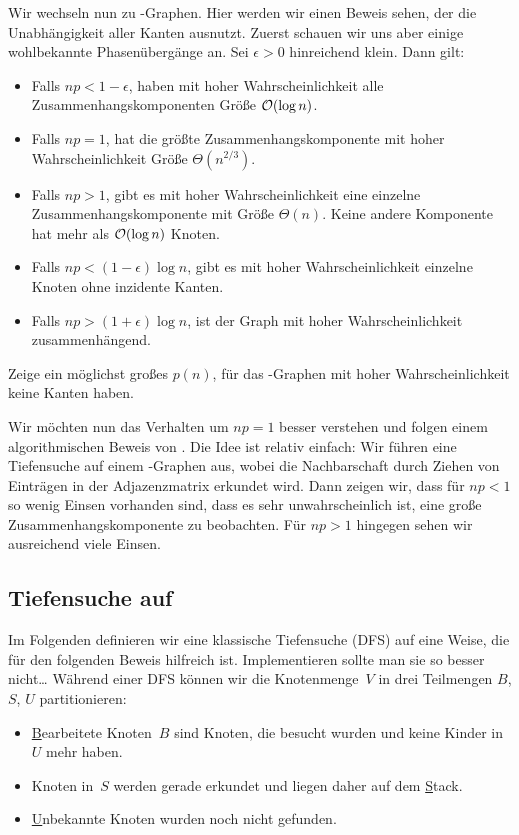 Wir wechseln nun zu \Gnp-Graphen.
Hier werden wir einen Beweis sehen, der die Unabhängigkeit aller Kanten ausnutzt.
Zuerst schauen wir uns aber einige wohlbekannte Phasenübergänge an.
Sei $\epsilon >0$ hinreichend klein.
Dann gilt:
\begin{itemize}
    \item Falls $np < 1 - \epsilon$, haben mit hoher Wahrscheinlichkeit alle Zusammenhangskomponenten Größe $\mathcal{O}\!\left(\log n\right)$.
    \item Falls $np = 1$, hat die größte Zusammenhangskomponente mit hoher Wahrscheinlichkeit Größe $\Theta(n^{2/3})$.
    \item Falls $np > 1$, gibt es mit hoher Wahrscheinlichkeit eine einzelne Zusammenhangskomponente mit Größe $\Theta(n)$.
          Keine andere Komponente hat mehr als $\mathcal{O}\!\left(\log n\right)$ Knoten.

    \item Falls $np < (1-\epsilon)\log n$, gibt es mit hoher Wahrscheinlichkeit einzelne Knoten ohne inzidente Kanten.
    \item Falls $np > (1+\epsilon)\log n$, ist der Graph mit hoher Wahrscheinlichkeit zusammenhängend.
\end{itemize}

\begin{exercise}
    Zeige ein möglichst großes $p(n)$, für das \Gnp-Graphen mit hoher Wahrscheinlichkeit keine Kanten haben.
\end{exercise}

Wir möchten nun das Verhalten um $np = 1$ besser verstehen und folgen einem algorithmischen Beweis von \cite{DBLP:journals/rsa/KrivelevichS13}.
Die Idee ist relativ einfach:
Wir führen eine Tiefensuche auf einem \Gnp-Graphen aus, wobei die Nachbarschaft durch Ziehen von Einträgen in der Adjazenzmatrix erkundet wird.
Dann zeigen wir, dass für $np < 1$ so wenig Einsen vorhanden sind, dass es sehr unwahrscheinlich ist, eine große Zusammenhangskomponente zu beobachten.
Für $np > 1$ hingegen sehen wir ausreichend viele Einsen.

\subsection{Tiefensuche auf \Gnp}
Im Folgenden definieren wir eine klassische Tiefensuche (DFS) auf eine Weise, die für den folgenden Beweis hilfreich ist.
Implementieren sollte man sie so besser nicht\dots
Während einer DFS können wir die Knotenmenge~$V$ in drei Teilmengen $B$, $S$, $U$ partitionieren:
\begin{itemize}
    \item \underline Bearbeitete Knoten~$B$ sind Knoten, die besucht wurden und keine Kinder in $U$ mehr haben.
    \item Knoten in~$S$ werden gerade erkundet und liegen daher auf dem \underline Stack.
    \item \underline Unbekannte Knoten wurden noch nicht gefunden.
\end{itemize}

